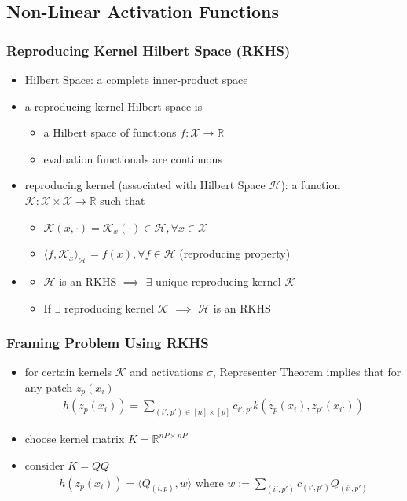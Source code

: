 \documentclass[hyperref={colorlinks}]{beamer}
\begin{document}
\subsection{Non-Linear Activation Functions}
\begin{frame}
	\frametitle{Reproducing Kernel Hilbert Space (RKHS)}
	\begin{itemize}
		\item 	Hilbert Space: a complete inner-product space
		\item 	a reproducing kernel Hilbert space is
		\begin{itemize}
			\item a Hilbert space of functions $f: \mathcal{X}\rightarrow \mathbb{R}$
			\item evaluation functionals are continuous
		\end{itemize}
	\item reproducing kernel (associated with Hilbert Space $\mathcal{H}$): a function $\mathcal{K}: \mathcal{X}\times\mathcal{X}\rightarrow\mathbb{R}$ such that
	\begin{itemize}
		\item $\mathcal{K}(x,\cdot)=\mathcal{K}_x(\cdot)\in\mathcal{H}, \forall x\in \mathcal{X}$
		\item $\langle f,\mathcal{K}_x \rangle_{\mathcal{H}} = f(x), \forall f\in\mathcal{H}$ (reproducing property)
	\end{itemize}
	\item
	\begin{itemize}
		\item $\mathcal{H}$ is an RKHS $\implies$ $\exists$ unique reproducing kernel $\mathcal{K}$
		\item If $\exists$ reproducing kernel $\mathcal{K}$ $\implies$ $\mathcal{H}$ is an RKHS 
	\end{itemize}
	\end{itemize}
\end{frame}


\begin{frame}
	\frametitle{Framing Problem Using RKHS}
	\begin{itemize}
		\item for certain kernels $\mathcal{K}$ and activations $\sigma$, Representer Theorem implies that for any patch $z_p(x_i)$
		\begin{align*}
			h(z_p(x_i))=\sum\limits_{(i',p')\in[n]\times[p]} c_{i',p'}k(z_p(x_i),z_{p'}(x_{i'}))
		\end{align*}
		\item choose kernel matrix $K=\mathbb{R}^{nP\times nP}$
		\item consider $K=QQ^{\top}$
		\begin{align*}
			h(z_p(x_i))=\langle Q_{(i,p)},w \rangle \text{ where } w:=\sum\limits_{(i',p')} c_{(i',p')}Q_{(i',p')}
		\end{align*}
	\end{itemize}
\end{frame}
\end{document}
